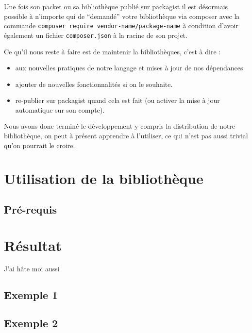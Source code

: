 \documentclass[11pt,a4paper,krantz2,11pt,oneside]{krantz}
\providecommand{\tightlist}{%
  \setlength{\itemsep}{0pt}\setlength{\parskip}{0pt}}
\begin{document}
Une fois son packet ou sa bibliothèque publié sur packagist il est désormais possible à n'importe qui de ``demandé'' votre bibliothèque via composer avec la commande \texttt{composer\ require\ vendor-name/package-name} à condition d'avoir également un fichier \texttt{composer.json} à la racine de son projet.

Ce qu'il nous reste à faire est de maintenir la bibliothèques, c'est à dire :

\begin{itemize}
\tightlist
\item
  aux nouvelles pratiques de notre langage et mises à jour de nos dépendances
\item
  ajouter de nouvelles fonctionnalités si on le souhaite.
\item
  re-publier sur packagist quand cela est fait (ou activer la mise à jour automatique sur son compte).
\end{itemize}

Nous avons donc terminé le développement y compris la distribution de notre bibliothèque, on peut à présent apprendre à l'utiliser, ce qui n'est pas aussi trivial qu'on pourrait le croire.

\hypertarget{utils}{%
\chapter{Utilisation de la bibliothèque}\label{utils}}

\hypertarget{utils-pre-requis}{%
\section{Pré-requis}\label{utils-pre-requis}}

\hypertarget{res}{%
\chapter{Résultat}\label{res}}

J'ai hâte moi aussi

\hypertarget{exemple-1}{%
\section{Exemple 1}\label{exemple-1}}

\hypertarget{exemple-2}{%
\section{Exemple 2}\label{exemple-2}}
\end{document}
